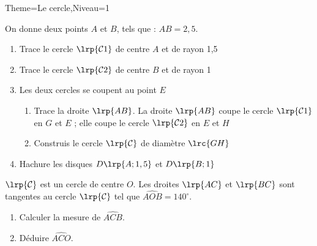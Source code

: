 \documentclass[a4paper,12pt]{article}
\begin{document}
\begin{Maquette}[Fiche]{Theme=Le cercle,Niveau=1}

\begin{exercice}
 On donne deux points $A$ et $B$, tels que : $AB= 2,5$.
 \begin{enumerate}
\item Trace le cercle $\lrp{\mathcal{C}1}$ de centre $A$ et de rayon 1,5
\item Trace le cercle $\lrp{\mathcal{C}2}$ de centre $B$ et de rayon 1
\item Les deux cercles se coupent au point $E$
\begin{enumerate}
\item Trace la droite $\lrp{AB}$.
La droite $\lrp{AB}$ coupe le cercle $\lrp{\mathcal{C}1}$ en $G$ et $E$ ; elle coupe le cercle $\lrp{\mathcal{C}2}$ en $E$ et $H$
\item Construis le cercle $\lrp{\mathcal{C}}$ de diamètre $\lrc{GH}$
\end{enumerate}
\item Hachure les disques $D\lrp{A ; 1,5}$ et $D\lrp{B ; 1}$
 \end{enumerate}
\end{exercice}

\begin{exercice}
\begin{minipage}{0.5\linewidth}
$\lrp{\mathcal{C}}$ est un cercle de centre $O$. Les droites $\lrp{AC}$ et $\lrp{BC}$ sont tangentes au cercle $\lrp{\mathcal{C}}$ tel que $\widehat{AOB}=140^{\circ}$.
\begin{enumerate}
\item Calculer la mesure de $\widehat{ACB}$.
\item Déduire $\widehat{ACO}$.
\end{enumerate}
\end{minipage}%
\begin{minipage}{0.5\linewidth}
\end{minipage}
\end{exercice}


\end{Maquette}
\end{document}
